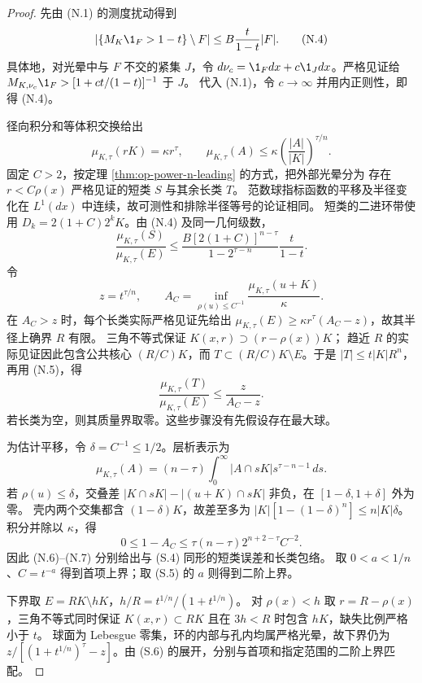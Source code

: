 \begin{proof}
先由 (N.1) 的测度扰动得到
\[|\{M_K\1_F>1-t\}\setminus F|\le B\frac t{1-t}|F|.\tag{N.4}\]
具体地，对光晕中与 $F$ 不交的紧集 $J$，令
$d\nu_c=\1_Fdx+c\1_Jdx$。严格见证给
$M_{K,\nu_c}\1_F>[1+ct/(1-t)]^{-1}$ 于 $J$。
代入 (N.1)，令 $c\to\infty$ 并用内正则性，即得 (N.4)。

径向积分和等体积交换给出
\[\mu_{K,\tau}(rK)=\kappa r^\tau,\qquad
\mu_{K,\tau}(A)\le\kappa\left(\frac{|A|}{|K|}\right)^{\tau/n}.\tag{N.5}\]
固定 $C>2$，按定理 \ref{thm:op-power-n-leading} 的方式，把外部光晕分为
存在 $r<C\rho(x)$ 严格见证的短类 $S$ 与其余长类 $T$。
范数球指标函数的平移及半径变化在 $L^1(dx)$ 中连续，故可测性和排除半径等号的论证相同。
短类的二进环带使用 $D_k=2(1+C)2^kK$。由 (N.4) 及同一几何级数，
\[\frac{\mu_{K,\tau}(S)}{\mu_{K,\tau}(E)}
\le\frac{B[2(1+C)]^{n-\tau}}{1-2^{\tau-n}}\frac t{1-t}.\tag{N.6}\]
令
\[z=t^{\tau/n},\qquad A_C=\inf_{\rho(u)\le C^{-1}}
\frac{\mu_{K,\tau}(u+K)}\kappa.\]
在 $A_C>z$ 时，每个长类实际严格见证先给出
$\mu_{K,\tau}(E)\ge\kappa r^\tau(A_C-z)$，故其半径上确界 $R$ 有限。
三角不等式保证 $K(x,r)\supset(r-\rho(x))K$；
趋近 $R$ 的实际见证因此包含公共核心 $(R/C)K$，而
$T\subset(R/C)K\setminus E$。于是 $|T|\le t|K|R^n$，再用 (N.5)，得
\[\frac{\mu_{K,\tau}(T)}{\mu_{K,\tau}(E)}
\le\frac z{A_C-z}.\tag{N.7}\]
若长类为空，则其质量界取零。这些步骤没有先假设存在最大球。

为估计平移，令 $\delta=C^{-1}\le1/2$。层析表示为
\[\mu_{K,\tau}(A)=(n-\tau)\int_0^\infty|A\cap sK|s^{\tau-n-1}\,ds.\tag{N.8}\]
若 $\rho(u)\le\delta$，交叠差
$|K\cap sK|-|(u+K)\cap sK|$ 非负，在 $[1-\delta,1+\delta]$ 外为零。
壳内两个交集都含 $(1-\delta)K$，故差至多为
$|K|[1-(1-\delta)^n]\le n|K|\delta$。积分并除以 $\kappa$，得
\[0\le1-A_C\le\tau(n-\tau)2^{n+2-\tau}C^{-2}.\tag{N.9}\]
因此 (N.6)--(N.7) 分别给出与 (S.4) 同形的短类误差和长类包络。
取 $0<a<1/n$、$C=t^{-a}$ 得到首项上界；取 (S.5) 的 $a$ 则得到二阶上界。

下界取 $E=RK\setminus hK$，$h/R=t^{1/n}/(1+t^{1/n})$。
对 $\rho(x)<h$ 取 $r=R-\rho(x)$，三角不等式同时保证
$K(x,r)\subset RK$ 且在 $3h<R$ 时包含 $hK$，缺失比例严格小于 $t$。
球面为 Lebesgue 零集，环的内部与孔内均属严格光晕，故下界仍为
$z/[(1+t^{1/n})^\tau-z]$。由 (S.6) 的展开，分别与首项和指定范围的二阶上界匹配。
\end{proof}

